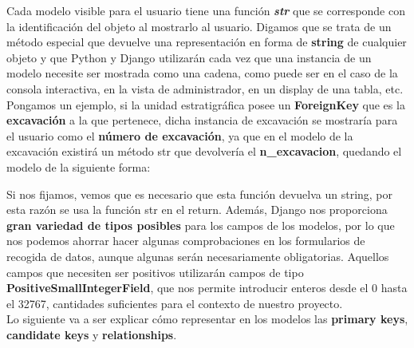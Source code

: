     Cada modelo visible para el usuario tiene una función \textbf{\textit{str}} que se
    corresponde con la identificación del objeto al mostrarlo al usuario. Digamos que se
    trata de un método especial que devuelve una representación en forma de \textbf{string} de
    cualquier objeto y que Python y Django utilizarán cada vez que una instancia de un 
    modelo necesite ser mostrada como una cadena, como puede ser en el caso de la consola
    interactiva, en la vista de administrador, en un display de una tabla, etc.\\

    Pongamos un ejemplo, si la unidad estratigráfica posee un \textbf{ForeignKey} que es
    la \textbf{excavación} a la que pertenece, dicha instancia de excavación se mostraría
    para el usuario como el \textbf{número de excavación}, ya que en el modelo de la
    excavación existirá un método str que devolvería el \textbf{n\_excavacion},
    quedando el modelo de la siguiente forma:



    Si nos fijamos, vemos que es necesario que esta función devuelva un string, por esta
    razón se usa la función str en el return. Además, Django nos proporciona \textbf{gran
    variedad de tipos posibles} para los campos de los modelos, por lo que nos podemos
    ahorrar hacer algunas comprobaciones en los formularios de recogida de datos, aunque
    algunas serán necesariamente obligatorias. Aquellos campos que necesiten ser positivos
    utilizarán campos de tipo \textbf{PositiveSmallIntegerField}, que nos permite introducir
    enteros desde el 0 hasta el 32767, cantidades suficientes para el contexto de nuestro
    proyecto.\\

    Lo siguiente va a ser explicar cómo representar en los modelos las \textbf{primary keys},
    \textbf{candidate keys} y \textbf{relationships}.\\
    
